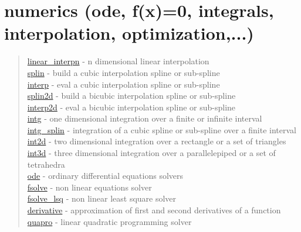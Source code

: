 \chapter*{numerics (ode, f(x)=0, integrals, interpolation,
  optimization,...)}


\begin{quote}
\noindent
\hyperlink{linear_interpn}{linear\_interpn} - n dimensional linear interpolation \\
\hyperlink{splin}{splin} - build a cubic interpolation spline or sub-spline \\
\hyperlink{interp}{interp} - eval a cubic interpolation spline or sub-spline \\
\hyperlink{splin2d}{splin2d} - build a bicubic interpolation spline or sub-spline \\
\hyperlink{interp2d}{interp2d} - eval a bicubic interpolation spline or sub-spline \\
\hyperlink{intg}{intg} - one dimensional integration over a finite or infinite interval \\
\hyperlink{intg_splin}{intg\_splin} - integration of a cubic spline or sub-spline over a finite interval \\
\hyperlink{int2d}{int2d} - two dimensional integration over a rectangle or a set of triangles \\
 \hyperlink{int3d}{int3d} - three dimensional integration over a parallelepiped  or a set of tetrahedra \\
\hyperlink{ode}{ode} - ordinary differential equations solvers \\
\hyperlink{fsolve}{fsolve} - non linear equations solver \\
\hyperlink{fsolve_lsq}{fsolve\_lsq} - non linear least square solver \\
\hyperlink{derivative}{derivative} - approximation of first and second derivatives of a function\\
\hyperlink{quapro}{quapro} - linear quadratic programming solver \\
\end{quote}



  


 
  
 
 
 
 
 
 
 
 
